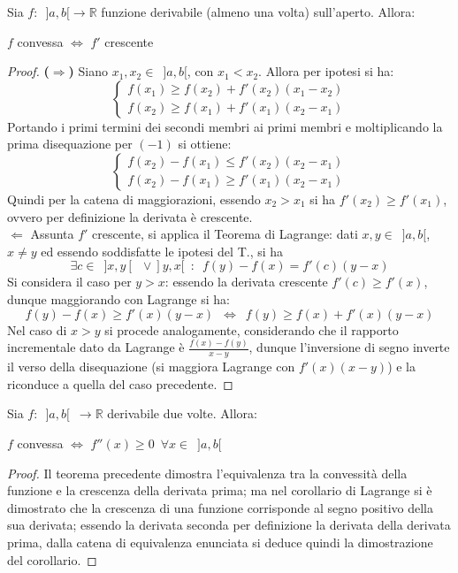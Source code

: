 \documentclass[10pt, oneside]{book}
\theoremstyle{plain}
\begin{document}
\begin{ther}
Sia $f : \enspace ]a, b[ \rightarrow \mathbb{R}$ funzione derivabile (almeno una volta) sull'aperto. Allora:
\begin{center}
    $f$ convessa $\Longleftrightarrow$ $f'$ crescente
\end{center}
\end{ther}
\begin{proof}
\textbf{($\Rightarrow$)} Siano $x_1, x_2 \in \enspace ]a, b[$, con $x_1 < x_2$. Allora per ipotesi si ha:
\[\begin{cases}
f(x_1) \geq f(x_2) + f'(x_2) (x_1 - x_2) \\
f(x_2) \geq f(x_1) + f'(x_1) (x_2 - x_1) 
\end{cases}\]
Portando i primi termini dei secondi membri ai primi membri e moltiplicando la prima disequazione per $(-1)$ si ottiene:
\[\begin{cases}
f(x_2) - f(x_1) \leq f'(x_2) (x_2 - x_1) \\
f(x_2) - f(x_1) \geq f'(x_1) (x_2 - x_1) 
\end{cases}\]
Quindi per la catena di maggiorazioni, essendo $x_2 > x_1$ si ha $f'(x_2) \geq f'(x_1)$, ovvero per definizione la derivata è crescente.\\
\textbf{$\Leftarrow$} Assunta $f'$ crescente, si applica il Teorema di Lagrange: dati $x, y \in \enspace ]a, b[$, $x \neq y$ ed essendo soddisfatte le ipotesi del T., si ha
\[\exists c \in \enspace ]x, y[ \enspace \lor ]y, x[ \enspace : \enspace f(y) - f(x) = f'(c) (y - x)\]
Si considera il caso per $y > x$: essendo la derivata crescente $f'(c) \geq f'(x)$, dunque maggiorando con Lagrange si ha:
\[f(y) - f(x) \geq f'(x) (y - x) \enspace \Leftrightarrow \enspace f(y) \geq f(x) + f'(x) (y - x)\]
Nel caso di $x > y$ si procede analogamente, considerando che il rapporto incrementale dato da Lagrange è $\frac{f(x) - f(y)}{x - y}$, dunque l'inversione di segno inverte il verso della disequazione (si maggiora Lagrange con $f'(x) (x - y)$) e la riconduce a quella del caso precedente.
\end{proof}

\begin{cor}
Sia $f : \enspace ]a, b[ \enspace \rightarrow \mathbb{R}$ derivabile due volte. Allora:
\begin{center}
$f$ convessa $\Longleftrightarrow$ $f''(x) \geq 0 \enspace \forall x \in \enspace ]a, b[$
\end{center}
\end{cor}
\begin{proof}
Il teorema precedente dimostra l'equivalenza tra la convessità della funzione e la crescenza della derivata prima; ma nel corollario di Lagrange si è dimostrato che la crescenza di una funzione corrisponde al segno positivo della sua derivata; essendo la derivata seconda per definizione la derivata della derivata prima, dalla catena di equivalenza enunciata si deduce quindi la dimostrazione del corollario.
\end{proof}
\end{document}
